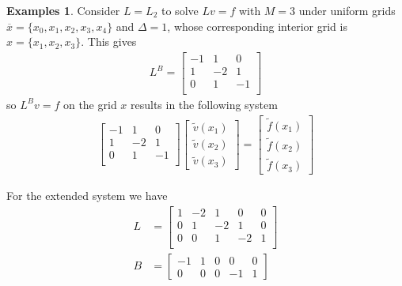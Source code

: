 \documentclass[11pt]{article}
\theoremstyle{definition}
\newtheorem{example}{Examples}[section]
\begin{document}
\begin{example}\label{ex:gaussian-elimination-reflecting-barrier}
	Consider $L = L_{2}$ to solve $L v = f$ with $M = 3$ under uniform grids $\overline{x} = \{x_0, x_1, x_2, x_3, x_4\}$ and $\Delta = 1$, whose corresponding interior grid is $x = \{x_1, x_2, x_3\}$. This gives
	\begin{align}
	L^B = 	 \begin{bmatrix}
	-1 & 1 & 0 \\
	1 & -2 & 1 \\
	0 & 1 & -1 \\
	\end{bmatrix}
	\end{align}
	so $L^B v= f$ on the grid $x$ results in the following system
	\begin{align} \label{eq:extended-system-reflecting-barrier-reduced-system}
	\begin{bmatrix}
	-1 & 1 & 0  \\
	1 & -2 & 1 \\
	0 & 1 & -1 \\
	\end{bmatrix} 	  \begin{bmatrix}
	\tilde{v}(x_1) \\
	\tilde{v}(x_2) \\
	\tilde{v}(x_3)
	\end{bmatrix}
	=
	\begin{bmatrix}
	\tilde{f}(x_1) \\
	\tilde{f}(x_2) \\
	\tilde{f}(x_3)
	\end{bmatrix}
	\end{align}


	For the extended system we have
	\begin{align}
	{L} &=
	\begin{bmatrix}
	1 & -2 & 1 & 0 & 0 \\
	0 & 1 & -2 & 1 & 0 \\
	0 & 0 & 1 & -2 & 1 \\
	\end{bmatrix} \\
	B &= \begin{bmatrix}
	-1 & 1  & 0 & 0 & 0 \\
	0 & 0 & 0 & -1 & 1
	\end{bmatrix}
	\end{align}


\end{example}
\end{document}
